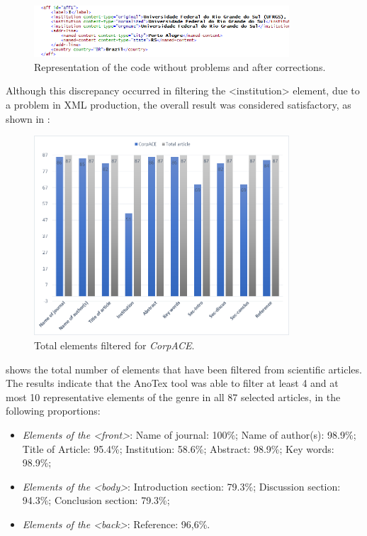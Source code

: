 \documentclass[english]{textolivre}
\begin{document}
\begin{figure}[htbp]
 \centering
 \includegraphics[width=0.85\textwidth]{Fig8.png}
 \caption{Representation of the code without problems and after corrections.}
 \label{fig-08}
\end{figure}

Although this discrepancy occurred in filtering the <institution> element, due to a problem in XML production, the overall result was considered satisfactory, as shown in :

\begin{figure}[htbp]
 \centering
 \includegraphics[width=0.85\textwidth]{Fig9.png}
 \caption{Total elements filtered for \textit{CorpACE}.}
 \label{fig-09}
\end{figure}

 shows the total number of elements that have been filtered from scientific articles. The results indicate that the AnoTex tool was able to filter at least 4 and at most 10 representative elements of the genre in all 87 selected articles, in the following proportions:

\begin{itemize}
    \item \textit{Elements of the <front>}: Name of journal: 100\%; Name of author(s): 98.9\%; Title of Article: 95.4\%; Institution: 58.6\%; Abstract: 98.9\%; Key words: 98.9\%;
    \item \textit{Elements of the <body>}: Introduction section: 79.3\%; Discussion section: 94.3\%; Conclusion section: 79.3\%;
    \item \textit{Elements of the <back>}: Reference: 96,6\%.
\end{itemize}
\end{document}
